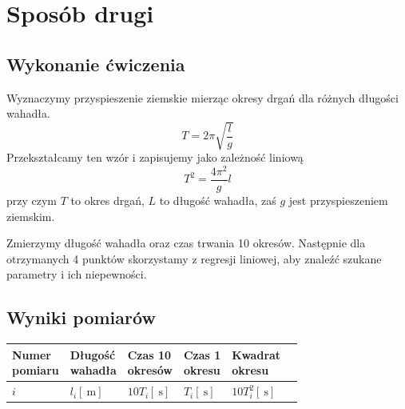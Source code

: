 \documentclass{fizykalab}
\def\pomvspace{\vspace{0.3em}}
\begin{document}
\section*{Sposób drugi}
 {\setlength{\parindent}{0pt}
  \subsection*{Wykonanie ćwiczenia}
  \par
  Wyznaczymy przyspieszenie ziemskie mierząc okresy drgań dla różnych długości wahadła.
  \[ T = 2\pi\sqrt{\frac{l}{g}} \]
  Przekształcamy ten wzór i zapisujemy jako zależność liniową
  \begin{equation}
	  \boxed{
		  T^2 = \frac{4\pi^2}{g}l
	  }
	  \tag{wzór roboczy}
  \end{equation}
  przy czym $T$ to okres drgań, $L$ to długość wahadła, zaś $g$ jest przyspieszeniem ziemskim.

  \pomvspace
  \par
  Zmierzymy długość wahadła oraz czas trwania 10 okresów. Następnie dla otrzymanych 4 punktów skorzystamy z regresji liniowej, aby znaleźć szukane parametry i ich niepewności.

  \subsection*{Wyniki pomiarów}
  \par
  \begin{table}[!ht]
	  \centering
	  \begin{tabular}{|l|l|l|l|l|l|}
		  \hline
		  \makecell{Numer                                                                                                         \\ pomiaru} & \makecell{Długość \\ wahadła} & \makecell{Czas 10 \\ okresów} & \makecell{Czas 1 \\ okresu} & \makecell{Kwadrat \\ okresu}  \\ \hline\hline
		  \rule{0pt}{3ex}$i$ & $l_i[\SI{}{\meter}]$ & $10T_i[\SI{}{\second}]$ & $T_i[\SI{}{\second}]$ & $10T_i^2[\SI{}{\second}]$ \\ \hline


\end{tabular}
\end{table}}
\end{document}
